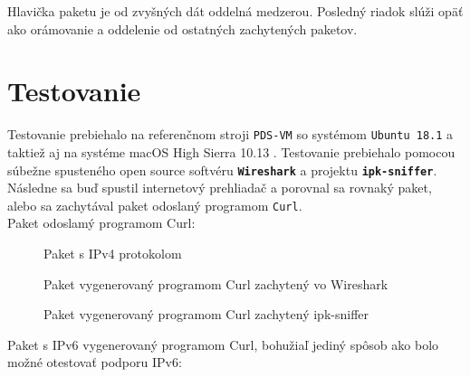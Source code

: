 \documentclass[11pt, a4paper]{article}
\begin{document}
Hlavička paketu je od zvyšných dát oddelná medzerou. Posledný riadok slúži opäť ako orámovanie a oddelenie od ostatných zachytených paketov.

	\newpage
	\section{Testovanie}
	Testovanie prebiehalo na referenčnom stroji \texttt{PDS-VM} so systémom \texttt{Ubuntu 18.1} a taktiež aj na systéme macOS High Sierra 10.13 . Testovanie prebiehalo pomocou súbežne spusteného open source softvéru \texttt{\textbf{Wireshark}} a projektu \texttt{\textbf{ipk-sniffer}}. Následne sa buď spustil internetový prehliadač a porovnal sa rovnaký paket, alebo sa zachytával paket odoslaný programom \texttt{Curl}.\\
	
	Paket odoslamý programom Curl:
	
	\begin{figure}[h]
	\centering
	\caption{Paket s IPv4 protokolom}
	
	\centering
	\caption{Paket vygenerovaný programom Curl zachytený vo Wireshark}
	
	\centering
	\caption{Paket vygenerovaný programom Curl zachytený ipk-sniffer}
	\end{figure}
\newpage
	Paket s IPv6 vygenerovaný programom Curl, bohužiaľ jediný spôsob ako bolo možné otestovať podporu IPv6:
	
\end{document}
